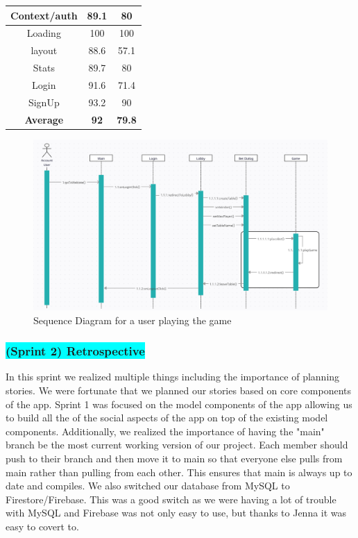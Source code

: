 \begin{table}[!hbt]
\begin{tabular}{|ccc|}
\multicolumn{1}{|c|}{Context/auth}       & \multicolumn{1}{c|}{89.1}          & 80            \\ \hline
\multicolumn{1}{|c|}{Loading}            & \multicolumn{1}{c|}{100}           & 100           \\ \hline
\multicolumn{1}{|c|}{layout}             & \multicolumn{1}{c|}{88.6}          & 57.1          \\ \hline
\multicolumn{1}{|c|}{Stats}              & \multicolumn{1}{c|}{89.7}          & 80            \\ \hline
\multicolumn{1}{|c|}{Login}              & \multicolumn{1}{c|}{91.6}          & 71.4          \\ \hline
\multicolumn{1}{|c|}{SignUp}             & \multicolumn{1}{c|}{93.2}          & 90            \\ \hline
\multicolumn{1}{|c|}{\textbf{Average}}   & \multicolumn{1}{c|}{\textbf{92}}   & \textbf{79.8} \\ \hline
\end{tabular}
\end{table}


\begin{figure}[!hbt]
    \centering
    \includegraphics[width=1.0\linewidth]{figures/sequence.png}
    \caption{Sequence Diagram for a user playing the game}
    \label{fig:sequence}
\end{figure}

\subsubsection{\colorbox{cyan}{(Sprint 2) Retrospective}}
In this sprint we realized multiple things including the importance of planning stories. We were fortunate that we planned our stories based on core components of the app. Sprint 1 was focused on the model components of the app allowing us to build all the of the social aspects of the app on top of the existing model components. Additionally, we realized the importance of having the "main" branch be the most current working version of our project. Each member should push to their branch and then move it to main so that everyone else pulls from main rather than pulling from each other. This ensures that main is always up to date and compiles. We also switched our database from MySQL to Firestore/Firebase. This was a good switch as we were having a lot of trouble with MySQL and Firebase was not only easy to use, but thanks to Jenna it was easy to covert to. 


